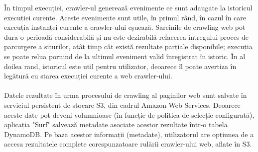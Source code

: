 În timpul execuției, crawler-ul generează evenimente ce sunt adaugate la istoricul execuției curente. Aceste evenimente sunt utile, în primul rând, în cazul în care execuția instanței curente a crawler-ului eșuează. Sarcinile de crawling web pot dura o perioadă considerabilă și nu este dezirabilă refacerea întregului proces de parcurgere a siturilor, atât timp cât există rezultate parțiale disponibile; execuția se poate relua pornind de la ultimul eveniment valid înregistrat în istoric.  În al doilea rand, istoricul este util pentru utilizator, deoarece îl poate avertiza în legătură cu starea execuției curente a web crawler-ului.
\\
\\
Datele rezultate în urma procesului de crawling al paginilor web sunt salvate în serviciul persistent de stocare S3, din cadrul Amazon Web Services. Deoarece aceste date pot deveni volumnioase (în funcție de politica de selecție configurată), aplicația "Surf" salvează metadate asociate acestor rezultate într-o tabela DynamoDB. Pe baza acestor informații (metadate), utilizatorul are opțiunea de a accesa rezultatele complete corespunzatoare rulării crawler-ului web, aflate în S3.